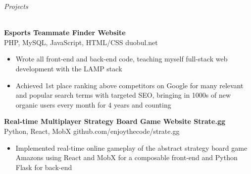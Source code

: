 \documentclass[letterpaper]{article}
\newcommand{\lineunder} {
    \vspace*{-8pt} \\
    \hspace*{-3pt} \hrulefill \\
}
\newcommand{\header} [1] {
	{\hspace*{-3pt}\vspace*{6pt} \textit{#1}}
    \vspace*{-6pt} \lineunder
}
\newcommand{\expheader}[4]{
    \vspace{2mm}
    \textbf{#1 \hfill #2}\\
    #3 \hfill #4\\
    \vspace{-3mm}
}
\begin{document}
\header{Projects}
\vspace{-1mm}

\expheader{Esports Teammate Finder Website}{}{PHP, MySQL, JavaScript, HTML/CSS}{duobul.net}
\begin{itemize} \itemsep 0pt
\item Wrote all front-end and back-end code, teaching myself full-stack web development with the LAMP stack \\
\item Achieved 1st place ranking above competitors on Google for many relevant and popular search terms with targeted SEO, bringing in 1000s of new organic users every month for 4 years and counting\\

\end{itemize}

\vspace{2mm}

\expheader{Real-time Multiplayer Strategy Board Game Website Strate.gg}{}{Python, React, MobX}{github.com/enjoythecode/strate.gg}
\begin{itemize} \itemsep 0pt
\item Implemented real-time online gameplay of the abstract strategy board game Amazons using React and MobX for a composable front-end and Python Flask for back-end\\
\end{itemize}
\end{document}
